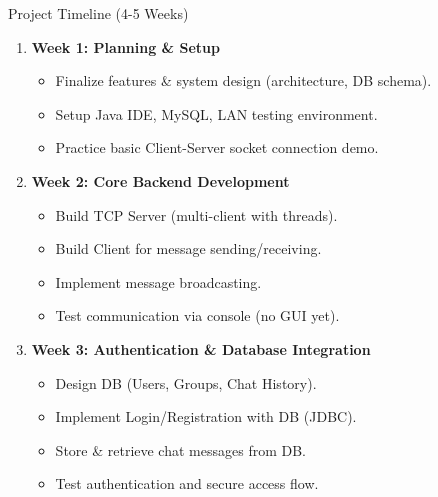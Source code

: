 \documentclass[aspectratio=1610]{beamer}
\begin{document}
\begin{frame}{Project Timeline (4-5 Weeks)}
\small
\vspace{0.2cm}

\begin{enumerate}
    \item \textbf{Week 1: Planning \& Setup}
    \begin{itemize}
        \item Finalize features \& system design (architecture, DB schema).
        \item Setup Java IDE, MySQL, LAN testing environment.
        \item Practice basic Client-Server socket connection demo.
    \end{itemize}

    \item \textbf{Week 2: Core Backend Development}
    \begin{itemize}
        \item Build TCP Server (multi-client with threads).
        \item Build Client for message sending/receiving.
        \item Implement message broadcasting.
        \item Test communication via console (no GUI yet).
    \end{itemize}

    \item \textbf{Week 3: Authentication \& Database Integration}
    \begin{itemize}
        \item Design DB (Users, Groups, Chat History).
        \item Implement Login/Registration with DB (JDBC).
        \item Store \& retrieve chat messages from DB.
        \item Test authentication and secure access flow.
    \end{itemize}

\end{enumerate}

\end{frame}
\end{document}
